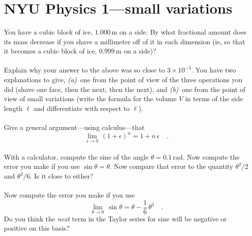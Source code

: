 \documentclass[12pt]{article}
\begin{document}
\newcommand{\m}{\mathrm{m}}
\newcommand{\rad}{\mathrm{rad}}
\thispagestyle{empty}

\section*{NYU Physics 1---small variations}

\paragraph{\theproblem}%
You have a cubic block of ice, $1.000\,\m$ on a side.  By what
fractional amount does its mass decrease if you shave a millimeter off
of it in each dimension (ie, so that it becomes a cubic block of ice,
$0.999\,\m$ on a side)?

\paragraph{\theproblem}%
Explain why your answer to the above was so close to $3\times
10^{-3}$.  You have two explanations to give, \textsl{(a)}~one from
the point of view of the three operations you did (shave one face,
then the next, then the next), and \textsl{(b)}~one from the point of
view of small variations (write the formula for the volume $V$ in
terms of the side length $\ell$ and differentiate with respect to
$\ell$).

\paragraph{\theproblem}%
Give a general argument---using calculus---that
\begin{equation}
\lim_{\epsilon\rightarrow 0}\,(1+\epsilon)^n=1+n\,\epsilon \quad .
\end{equation}

\paragraph{\theproblem}%
With a calculator, compute the sine of the angle $\theta=0.1\,\rad$.
Now compute the error you make if you use $\sin\theta=\theta$.  Now
compare that error to the quantity $\theta^2/2$ and $\theta^3/6$.  Is
it close to either?

\paragraph{\theproblem}%
Now compute the error you make if you use
\begin{equation}
\lim_{\theta\rightarrow 0}\,\sin\theta=\theta-\frac{1}{6}\,\theta^3 \quad .
\label{eq:third}
\end{equation}
Do you think the \emph{next} term in the Taylor series for sine will
be negative or positive on this basis?
\end{document}
